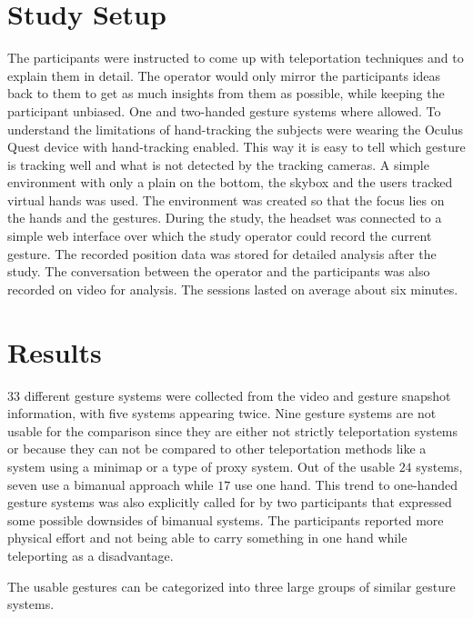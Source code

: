 \section{Study Setup}
The participants were instructed to come up with teleportation techniques and to explain them in detail. The operator would only mirror the participants ideas back to them to get as much insights from them as possible, while keeping the participant unbiased. One and two-handed gesture systems where allowed. To understand the limitations of hand-tracking the subjects were wearing the Oculus Quest device with hand-tracking enabled. This way it is easy to tell which gesture is tracking well and what is not detected by the tracking cameras. A simple environment with only a plain on the bottom, the skybox and the users tracked virtual hands was used. The environment was created so that the focus lies on the hands and the gestures. During the study, the headset was connected to a simple web interface over which the study operator could record the current gesture. The recorded position data was stored for detailed analysis after the study. The conversation between the operator and the participants was also recorded on video for analysis. The sessions lasted on average about six minutes.

\section{Results}
$33$ different gesture systems were collected from the video and gesture snapshot information, with five systems appearing twice. Nine gesture systems are not usable for the comparison since they are either not strictly teleportation systems or because they can not be compared to other teleportation methods like a system using a minimap or a type of proxy system. Out of the usable $24$ systems, seven use a bimanual approach while $17$ use one hand. This trend to one-handed gesture systems was also explicitly called for by two participants that expressed some possible downsides of bimanual systems. The participants reported more physical effort and not being able to carry something in one hand while teleporting as a disadvantage.

The usable gestures can be categorized into three large groups of similar gesture systems. 

